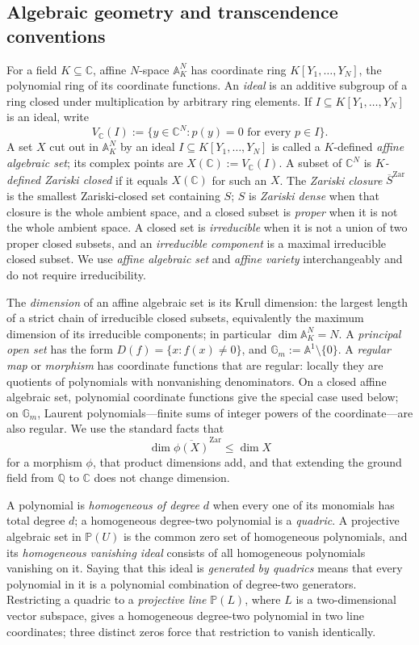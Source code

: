 \documentclass[11pt]{article}
\theoremstyle{definition}
\theoremstyle{remark}
\newcommand{\C}{\mathbb C}
\newcommand{\Q}{\mathbb Q}
\begin{document}
\subsection{Algebraic geometry and transcendence conventions}
\label{sec:algebraic-preliminaries}

For a field $K\subseteq\C$, affine $N$-space $\mathbb A_K^N$ has
coordinate ring $K[Y_1,\ldots,Y_N]$, the polynomial ring of its coordinate
functions.  An \emph{ideal} is an additive subgroup of a ring closed under
multiplication by arbitrary ring elements.  If
$I\subseteq K[Y_1,\ldots,Y_N]$ is an ideal, write
\[
  V_{\C}(I):=\{y\in\C^N:p(y)=0\text{ for every }p\in I\}.
\]
A set $X$ cut out in $\mathbb A_K^N$ by an ideal
$I\subseteq K[Y_1,\ldots,Y_N]$ is called a $K$-defined
\emph{affine algebraic set}; its complex points are
$X(\C):=V_{\C}(I)$.  A subset of $\C^N$ is \emph{$K$-defined Zariski
closed} if it equals $X(\C)$ for such an $X$.  The \emph{Zariski closure}
$\overline{S}^{\mathrm{Zar}}$ is the smallest Zariski-closed set containing
$S$; $S$ is \emph{Zariski dense} when that closure is the whole ambient
space, and a closed subset is \emph{proper} when it is not the whole
ambient space.  A closed set is
\emph{irreducible} when it is not a union of two proper closed subsets, and
an \emph{irreducible component} is a maximal irreducible closed subset.  We
use \emph{affine algebraic set} and \emph{affine variety} interchangeably
and do not require irreducibility.

The \emph{dimension} of an affine algebraic set is its Krull dimension: the
largest length of a strict chain of irreducible closed subsets, equivalently
the maximum dimension of its irreducible components; in particular
$\dim\mathbb A_K^N=N$.  A \emph{principal open set} has the form
$D(f)=\{x:f(x)\ne0\}$, and
$\mathbb G_m:=\mathbb A^1\setminus\{0\}$.  A \emph{regular map} or
\emph{morphism} has coordinate functions that are regular: locally they are
quotients of polynomials with nonvanishing denominators.  On a closed affine
algebraic set, polynomial coordinate functions give the special case used
below; on $\mathbb G_m$, Laurent polynomials---finite sums of integer powers
of the coordinate---are also regular.  We use the
standard facts that
\[
  \dim\overline{\phi(X)}^{\mathrm{Zar}}\le\dim X
\]
for a morphism $\phi$, that product dimensions add, and that extending the
ground field from $\Q$ to $\C$ does not change dimension.

A polynomial is \emph{homogeneous of degree $d$} when every one of its
monomials has total degree $d$; a homogeneous degree-two polynomial is a
\emph{quadric}.  A projective algebraic set in $\mathbb P(U)$ is the common
zero set of homogeneous polynomials, and its \emph{homogeneous vanishing
ideal} consists of all homogeneous polynomials vanishing on it.  Saying that
this ideal is \emph{generated by quadrics} means that every polynomial in it
is a polynomial combination of degree-two generators.  Restricting a
quadric to a \emph{projective line} $\mathbb P(L)$, where $L$ is a
two-dimensional vector subspace, gives a homogeneous degree-two polynomial in
two line coordinates; three distinct zeros force that restriction to vanish
identically.
\end{document}
